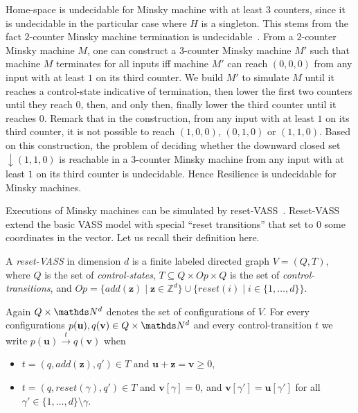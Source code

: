 \documentclass[runningheads]{llncs}
\begin{document}
Home-space is undecidable for Minsky machine with at least $3$ counters, since it is undecidable in the particular case where $H$ is a singleton.
This stems from the fact $2$-counter Minsky machine termination is undecidable~\cite{Min61,Min67}.
From a $2$-counter Minsky machine $M$, one can construct a $3$-counter Minsky machine $M'$ 
such that machine $M$ terminates for all inputs iff machine $M'$ can reach $(0,0,0)$ from any input with at least $1$ on its third counter. We build $M'$ to simulate $M$ until it reaches a control-state indicative of termination, then lower the first two counters until they reach $0$, then, and only then, finally lower the third counter until it reaches $0$.
Remark that in the construction, from any input with at least $1$ on its third counter, it is not possible to reach $(1,0,0)$, $(0,1,0)$ or $(1,1,0)$.
Based on this construction, the problem of deciding whether the downward closed set $\downarrow (1,1,0)$ is reachable in a $3$-counter Minsky machine
from any input with at least $1$ on its third counter is undecidable. 
Hence {\sc Resilience} is undecidable for Minsky machines.


Executions of Minsky machines can be simulated by reset-VASS~\cite{araki1976PN}. 
Reset-VASS extend the basic VASS model with special “reset
transitions” that set to $0$ some coordinates in the vector. Let us recall their definition here.
\begin{definition}
A {\em reset-VASS} in dimension $d$ 
 is a finite 
labeled directed graph $V = (Q,T)$, where $Q$ is the set of {\em control-states}, 
$T \subseteq Q \times Op \times Q$
is the set of {\em control-transitions}, and $Op = \{ add(\textbf{z}) \mid \textbf{z} \in \mathds{Z}^d\} \cup 
		\{ reset(i) \mid i \in \{1,\ldots,d\} \}$.
\end{definition}

Again $Q \times \N^d$
 denotes the set of configurations of $V$.
For every configurations $p(\textbf{u}), q(\textbf{v}) \in Q \times \N^d$ and every control-transition $t$ we write
$p(\textbf{u}) \xrightarrow{t} q(\textbf{v})$ when 
\begin{samepage}\begin{itemize}
\item  $t = (q,add(\textbf{z}),q') \in T$
and $\textbf{u}+\textbf{z} = \textbf{v} \geq 0$,
\item $t = (q,reset(\gamma),q') \in T$ 
and
$\textbf{v}[\gamma] = 0$, and $\textbf{v}[\gamma'] = \textbf{u}[\gamma']$ for all $\gamma' \in \{1,\ldots, d\} \setminus \gamma$.
\end{itemize} \end{samepage}
\end{document}
